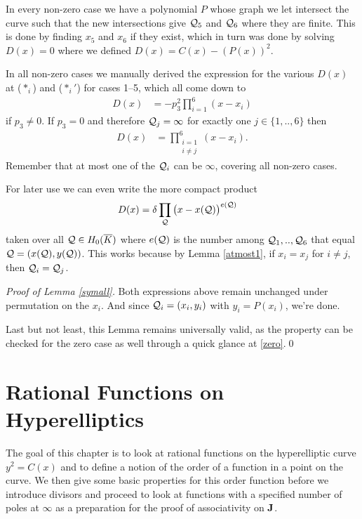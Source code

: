 \documentclass[english,11pt,a4paper]{article}
\begin{document}
\begin{remark}\label{remD}
  In every non-zero case we have a polynomial $P$ whose graph we let intersect the curve such that the new intersections give $\mathcal{Q}_5$ and $\mathcal{Q}_6$ where they are finite. This is done by finding $x_5$ and $x_6$ if they exist, which in turn was done by solving $D(x) = 0$ where we defined $D(x) = C(x) - (P(x))^2$.

  In all non-zero cases we manually derived the expression for the various $D(x)$ at ($*_i$) and ($*_i'$) for cases 1--5, which all come down to
  \begin{align*}
    D(x) &= -p_3^2\prod_{i=1}^6(x-x_i)
  \end{align*}
  if $p_3 \neq 0$. If $p_3 = 0$ and therefore $\mathcal{Q}_j = \infty$ for exactly one $j \in \{1,..,6\}$ then
  \begin{align*}
    D(x) &=  \prod_{\substack{i=1\\i \neq j}}^6(x-x_i).
  \end{align*}
  Remember that at most one of the $\mathcal{Q}_i$ can be $\infty$, covering all non-zero cases.

  For later use we can even write the more compact product
  \begin{align*}
    D(x) &= \delta \prod_{\mathcal{Q}} \big(x-x(\mathcal{Q})\big)^{e(\mathcal{Q})}
  \end{align*}
  taken over all $\mathcal{Q}  \in H_0(\overline K)$ where $e(\mathcal{Q})$ is the number among $\mathcal{Q}_1,..,\mathcal{Q}_6$ that equal $\mathcal{Q} = (x(\mathcal{Q}), y(\mathcal{Q}))$. This works because by Lemma \ref{atmost1}, if $x_i = x_j$ for $i \neq j$, then $\mathcal{Q}_i = \mathcal{Q}_j$.
\end{remark}

\emph{Proof of Lemma \ref{symall}.}
  Both expressions above remain unchanged under permutation on the $x_i$. And since $\mathcal{Q}_i = (x_i, y_i)$ with $y_i = P(x_i)$, we're done.

  Last but not least, this Lemma remains universally valid, as the property can be checked for the zero case as well through a quick glance at \eqref{zero}.\hfill \qed

\newpage

\section{Rational Functions on Hyperelliptics}

The goal of this chapter is to look at rational functions on the hyperelliptic curve $y^2 = C(x)$ and to define a notion of the order of a function in a point on the curve. We then give some basic properties for this order function before we introduce divisors and proceed to look at functions with a specified number of poles at $\infty$ as a preparation for the proof of associativity on $\mathbf{J}$.
\end{document}
